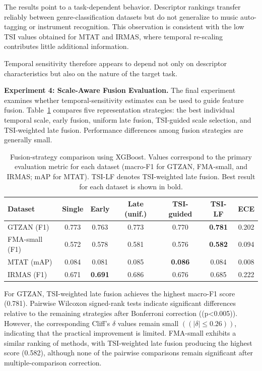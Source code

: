 \documentclass[runningheads]{llncs}
\begin{document}
The results point to a task-dependent behavior. Descriptor rankings transfer reliably between genre-classification datasets but do not generalize to music auto-tagging or instrument recognition. This observation is consistent with the low TSI values obtained for MTAT and IRMAS, where temporal re-scaling contributes little additional information.

Temporal sensitivity therefore appears to depend not only on descriptor characteristics but also on the nature of the target task.

\textbf{Experiment 4: Scale-Aware Fusion Evaluation.} The final experiment examines whether temporal-sensitivity estimates can be used to guide feature fusion. Table~\ref{tab:fusion} compares five representation strategies: the best individual temporal scale, early fusion, uniform late fusion, TSI-guided scale selection, and TSI-weighted late fusion. Performance differences among fusion strategies are generally small.


\begin{table}[!htp]
\centering
\caption{Fusion-strategy comparison using XGBoost. Values correspond to the primary evaluation metric for each dataset (macro-F1 for GTZAN, FMA-small, and IRMAS; mAP for MTAT). TSI-LF denotes TSI-weighted late fusion. Best result for each dataset is shown in bold.}
\label{tab:fusion}
\begin{tabular}{|l|ccccc|c|}
\hline
Dataset & Single & Early & Late (unif.) & TSI-guided & TSI-LF & ECE \\
\hline
GTZAN (F1)     & 0.773 & 0.763 & 0.773 & 0.770 & \textbf{0.781} & 0.202 \\
FMA-small (F1) & 0.572 & 0.578 & 0.581 & 0.576 & \textbf{0.582} & 0.094 \\
MTAT (mAP)     & 0.084 & 0.081 & 0.085 & \textbf{0.086} & 0.084 & 0.008 \\
IRMAS (F1)     & 0.671 & \textbf{0.691} & 0.686 & 0.676 & 0.685 & 0.222 \\
\hline
\end{tabular}
\end{table}

For GTZAN, TSI-weighted late fusion achieves the highest macro-F1 score (0.781). Pairwise Wilcoxon signed-rank tests indicate significant differences relative to the remaining strategies after Bonferroni correction ((p<0.005)). However, the corresponding Cliff's $\delta$ \textcolor{red}{\cite{cliff1993dominance}} values remain small $((|\delta|\leq0.26))$, indicating that the practical improvement is limited. FMA-small exhibits a similar ranking of methods, with TSI-weighted late fusion producing the highest score (0.582), although none of the pairwise comparisons remain significant after multiple-comparison correction.
\end{document}
